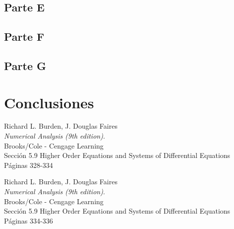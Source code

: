 \documentclass[titlepage,a4paper]{article}
\begin{document}
	\subsection{Parte E}\label{sec:parteE}

	\subsection{Parte F}\label{sec:parteF}

	\subsection{Parte G}\label{sec:parteG}

\section{Conclusiones}\label{sec:conc}


\begin{thebibliography}{9} 
		Richard L. Burden, J. Douglas Faires\\
		\textit{Numerical Analysis (9th edition)}. \\
		Brooks/Cole - Cengage Learning\\
		Sección 5.9 Higher Order Equations and Systems of Differential Equations\\
		Páginas 328-334

		Richard L. Burden, J. Douglas Faires\\
		\textit{Numerical Analysis (9th edition)}.\\ 
		Brooks/Cole - Cengage Learning\\
		Sección 5.9 Higher Order Equations and Systems of Differential Equations\\
		Páginas 334-336
	 
\end{thebibliography}
\end{document}
